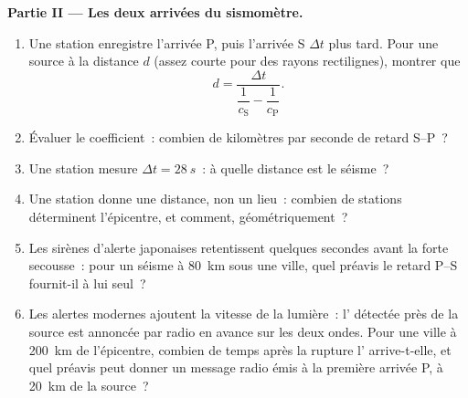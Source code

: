 \begin{problem}
\medskip\noindent\textbf{Partie II --- Les deux arrivées du sismomètre.}
\begin{enumerate}[resume]
  \item Une station enregistre l'arrivée P, puis l'arrivée S $\Delta t$
        plus tard. Pour une source à la distance $d$ (assez courte
        pour des rayons rectilignes), montrer que
        \[
        d = \frac{\Delta t}{\dfrac{1}{c_{\text{S}}} -
        \dfrac{1}{c_{\text{P}}}} .
        \]
  \item Évaluer le coefficient~: combien de kilomètres par seconde de
        retard S--P~?
  \item Une station mesure $\Delta t = \qty{28}{s}$~: à quelle
        distance est le séisme~?
  \item Une station donne une distance, non un lieu~: combien de
        stations déterminent l'épicentre, et comment, géométriquement~?
  \item Les sirènes d'alerte japonaises retentissent quelques secondes
        avant la forte secousse~: pour un séisme à \qty{80}{km} sous
        une ville, quel préavis le retard P--S fournit-il à lui seul~?
  \item Les alertes modernes ajoutent la vitesse de la lumière~:
        l' détectée près de la source est annoncée par radio en
        avance sur les deux ondes. Pour une ville à \qty{200}{km} de
        l'épicentre, combien de temps après la rupture l'
        arrive-t-elle, et quel préavis peut donner un message radio
        émis à la première arrivée P, à \qty{20}{km} de la source~?
\end{enumerate}


\end{problem}
